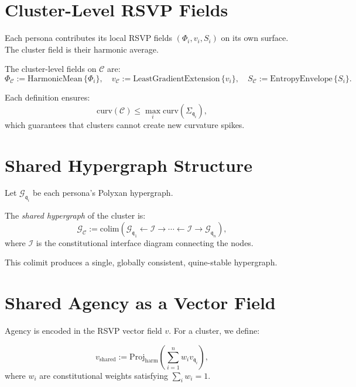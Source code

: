 \section{Cluster-Level RSVP Fields}

Each persona contributes its local RSVP fields 
$(\Phi_i, v_i, S_i)$ on its own surface.
The cluster field is their harmonic average.

\begin{definition}
The cluster-level fields on $\mathcal{C}$ are:
\[
\Phi_{\mathcal{C}}
:= 
\mathrm{HarmonicMean}\,\{\Phi_i \},
\quad
v_{\mathcal{C}}
:= 
\mathrm{LeastGradientExtension}\,\{v_i\},
\quad
S_{\mathcal{C}}
:= 
\mathrm{EntropyEnvelope}\,\{S_i\}.
\]
\end{definition}

Each definition ensures:
\[
\mathrm{curv}(\mathcal{C})
\le
\max_i \mathrm{curv}(\Sigma_{\mathfrak{q}_i}),
\]
which guarantees that clusters cannot create new curvature spikes.


\section{Shared Hypergraph Structure}

Let $\mathcal{G}_{\mathfrak{q}_i}$ be each persona’s Polyxan hypergraph.

\begin{definition}
The \emph{shared hypergraph} of the cluster is:
\[
\mathcal{G}_{\mathcal{C}}
:= 
\mathrm{colim}\left(
\mathcal{G}_{\mathfrak{q}_1}
\leftarrow
\mathcal{I}
\rightarrow
\cdots
\leftarrow
\mathcal{I}
\rightarrow
\mathcal{G}_{\mathfrak{q}_n}
\right),
\]
where $\mathcal{I}$ is the constitutional interface diagram connecting the nodes.
\end{definition}

This colimit produces a single, globally consistent, quine-stable hypergraph.


\section{Shared Agency as a Vector Field}

Agency is encoded in the RSVP vector field $v$.
For a cluster, we define:

\begin{definition}
\[
v_{\mathrm{shared}}
:= 
\mathrm{Proj}_{\mathrm{harm}}
\left(
\sum_{i=1}^n w_i v_{\mathfrak{q}_i}
\right),
\]
where $w_i$ are constitutional weights satisfying $\sum_i w_i = 1$.
\end{definition}

